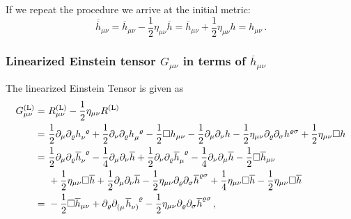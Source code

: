 If we repeat the procedure we arrive at the initial metric:
\begin{equation}
    \overline{\overline{h}}_{\mu\nu} = \overline{h}_{\mu\nu} - \frac{1}{2}
    \eta_{\mu\nu}\overline{h} = \overline{h}_{\mu\nu} + \frac{1}{2}
    \eta_{\mu\nu}h= h_{\mu\nu}\,.
\end{equation}
\subsubsection{Linearized Einstein tensor \texorpdfstring{$G_{\mu\nu}$}{Gmunu} in terms of \texorpdfstring{$\overline{h}_{\mu\nu}$}{hbarmunu}}
The linearized Einstein Tensor is given as
\begin{equation}
    \begin{split}
        G_{\mu\nu}^{\text{(L)}} =\ & R_{\mu\nu}^{\text{(L)}} - \frac{1}{2} \eta_{\mu\nu} R^{\text{(L)}} \\
        =\ & \frac{1}{2} \partial_\mu \partial_\varrho \tensor{h}{_\nu^\varrho} + \frac{1}{2} \partial_\nu \partial_\varrho \tensor{h}{_\mu^\varrho}
        - \frac{1}{2} \Box h_{\mu\nu} - \frac{1}{2}
        \partial_{\mu}\partial_\nu h-\frac{1}{2}
        \eta_{\mu\nu}\partial_\varrho\partial_\sigma h^{\varrho\sigma} + \frac{1}{2} \eta_{\mu\nu}\Box h \\
        =\ & \frac{1}{2} \partial_\mu\partial_\varrho \tensor{\overline{h}}{_\nu^\varrho}
        - {\frac{1}{4}\partial_\mu\partial_\nu\overline{h}}
        + \frac{1}{2} \partial_\nu\partial_\varrho\tensor{\overline{h}}{_\mu^\varrho}
        - {\frac{1}{4}\partial_\nu\partial_\mu\overline{h}} - \frac{1}{2}\Box\overline{h}_{\mu\nu} \\
        & + {\frac{1}{2}\eta_{\mu\nu}\Box\overline{h}} + {\frac{1}{2}\partial_\mu\partial_\nu\overline{h}}
        - \frac{1}{2}\eta_{\mu\nu}\partial_\varrho\partial_\sigma\overline{h}^{\varrho\sigma}
        + {\frac{1}{4}\eta_{\mu\nu}\Box\overline{h}} - {\frac{1}{2}\eta_{\mu\nu}\Box\overline{h}} \\
        =\ & -\frac{1}{2} \Box \overline{h}_{\mu\nu} + \partial_\varrho \tensor{\partial}{_(_\mu}\tensor{\overline{h}}{_\nu_)^\varrho}
        - \frac{1}{2} \eta_{\mu\nu}\partial_\varrho\partial_\sigma
        \overline{h}^{\varrho\sigma}\,,
    \end{split}
\end{equation} 
